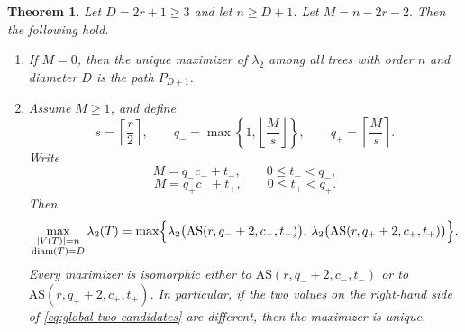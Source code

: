 \documentclass[10pt,a4paper]{amsart}
\newtheorem{theorem}{Theorem}
\newcommand{\AS}{\mathrm{AS}}
\newcommand{\diam}{\operatorname{diam}}
\begin{document}
\begin{theorem}\label{thm:global-odd}
Let $D=2r+1\ge 3$ and let $n\ge D+1$.
Let $M=n-2r-2.$ Then the following hold.
\begin{enumerate}[label=\textnormal{(\roman*)}]
    \item If $M=0$, then the unique maximizer of $\lambda_2$ among all trees with order $n$ and
    diameter $D$ is the path $P_{D+1}$.
    \item Assume $M\ge 1$, and define
    $$
    s=\left\lceil \frac{r}{2}\right\rceil,
    \qquad
    q_-=\max\!\left\{1,\left\lfloor \frac{M}{s}\right\rfloor\right\},
    \qquad
    q_+=\left\lceil \frac{M}{s}\right\rceil.
    $$
    Write
    $$
    M=q_-c_-+t_-,\qquad 0\le t_-<q_-,
    $$
    $$
    M=q_+c_++t_+,\qquad 0\le t_+<q_+.
    $$
    Then
    \begin{equation}\label{eq:global-two-candidates}
    \max_{\substack{|V(T)|=n\\ \diam(T)=D}} \lambda_2(T)
    =
    \max\Bigl\{\lambda_2\bigl(\AS(r,q_-+2,c_-,t_-)\bigr),\,
    \lambda_2\bigl(\AS(r,q_++2,c_+,t_+)\bigr)\Bigr\}.
    \end{equation}
    Every maximizer is isomorphic either to $\AS(r,q_-+2,c_-,t_-)$ or to $\AS(r,q_++2,c_+,t_+)$.
    In particular, if the two values on the right-hand side of \eqref{eq:global-two-candidates}
    are different, then the maximizer is unique.
\end{enumerate}
\end{theorem}
\end{document}
